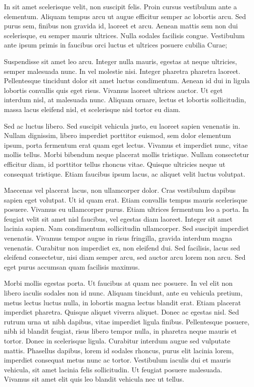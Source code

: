 \documentclass[10pt]{article}
\begin{document}
	In sit amet scelerisque velit, non suscipit felis. Proin cursus vestibulum ante a elementum. Aliquam tempus arcu ut augue efficitur semper ac lobortis arcu. Sed purus sem, finibus non gravida id, laoreet et arcu. Aenean mattis sem non dui scelerisque, eu semper mauris ultrices. Nulla sodales facilisis congue. Vestibulum ante ipsum primis in faucibus orci luctus et ultrices posuere cubilia Curae;
	
	Suspendisse sit amet leo arcu. Integer nulla mauris, egestas at neque ultricies, semper malesuada nunc. In vel molestie nisi. Integer pharetra pharetra laoreet. Pellentesque tincidunt dolor sit amet luctus condimentum. Aenean id dui in ligula lobortis convallis quis eget risus. Vivamus laoreet ultrices auctor. Ut eget interdum nisl, at malesuada nunc. Aliquam ornare, lectus et lobortis sollicitudin, massa lacus eleifend nisl, et scelerisque nisl tortor eu diam.
	
	Sed ac luctus libero. Sed suscipit vehicula justo, eu laoreet sapien venenatis in. Nullam dignissim, libero imperdiet porttitor euismod, sem dolor elementum ipsum, porta fermentum erat quam eget lectus. Vivamus et imperdiet nunc, vitae mollis tellus. Morbi bibendum neque placerat mollis tristique. Nullam consectetur efficitur diam, id porttitor tellus rhoncus vitae. Quisque ultricies neque ut consequat tristique. Etiam faucibus ipsum lacus, ac aliquet velit luctus volutpat.
	
	Maecenas vel placerat lacus, non ullamcorper dolor. Cras vestibulum dapibus sapien eget volutpat. Ut id quam erat. Etiam convallis tempus mauris scelerisque posuere. Vivamus eu ullamcorper purus. Etiam ultrices fermentum leo a porta. In feugiat velit sit amet nisl faucibus, vel egestas diam laoreet. Integer sit amet lacinia sapien. Nam condimentum sollicitudin ullamcorper. Sed suscipit imperdiet venenatis. Vivamus tempor augue in risus fringilla, gravida interdum magna venenatis. Curabitur non imperdiet ex, non eleifend dui. Sed facilisis, lacus sed eleifend consectetur, nisi diam semper arcu, sed auctor arcu lorem non arcu. Sed eget purus accumsan quam facilisis maximus.
	
	Morbi mollis egestas porta. Ut faucibus at quam nec posuere. In vel elit non libero iaculis sodales non id nunc. Aliquam tincidunt, ante eu vehicula pretium, metus lectus luctus nulla, in lobortis magna lectus blandit erat. Etiam placerat imperdiet pharetra. Quisque aliquet viverra aliquet. Donec ac egestas nisl. Sed rutrum urna ut nibh dapibus, vitae imperdiet ligula finibus. Pellentesque posuere, nibh id blandit feugiat, risus libero tempor nulla, in pharetra neque mauris et tortor. Donec in scelerisque ligula. Curabitur interdum augue sed vulputate mattis. Phasellus dapibus, lorem id sodales rhoncus, purus elit lacinia lorem, imperdiet consequat metus nunc ac tortor. Vestibulum iaculis dui et mauris vehicula, sit amet lacinia felis sollicitudin. Ut feugiat posuere malesuada. Vivamus sit amet elit quis leo blandit vehicula nec ut tellus.
	
\end{document}
